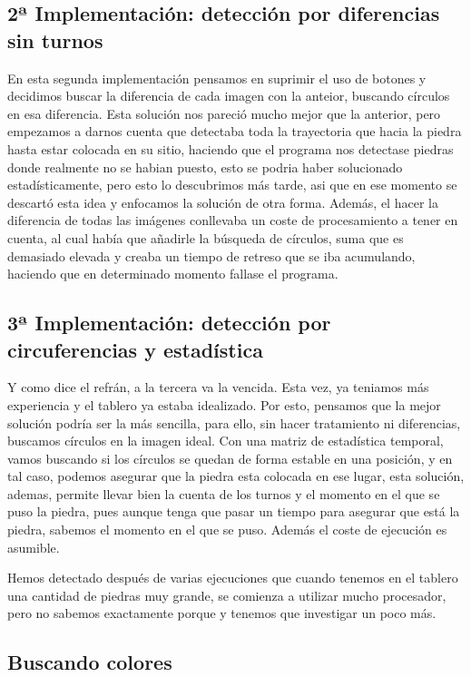 \documentclass[12pt,a4papert,woside,openright,titlepage,final]{book}
\begin{document}
\subsection{2ª Implementación: detección por diferencias sin turnos}

En esta segunda implementación pensamos en suprimir el uso de botones y
decidimos buscar la diferencia de cada imagen con la anteior, buscando círculos
en esa diferencia. Esta solución nos pareció mucho mejor que la anterior, pero
empezamos a darnos cuenta que detectaba toda la trayectoria que hacia la piedra
hasta estar colocada en su sitio, haciendo que el programa nos detectase piedras
donde realmente no se habian puesto, esto se podria haber solucionado
estadísticamente, pero esto lo descubrimos más tarde, asi que en ese momento se
descartó esta idea y enfocamos la solución de otra forma. Además, el hacer la
diferencia de todas las imágenes conllevaba un coste de procesamiento a tener en
cuenta, al cual había que añadirle la búsqueda de círculos, suma que es
demasiado elevada y creaba un tiempo de retreso que se iba acumulando, haciendo
que en determinado momento fallase el programa.

\subsection{3ª Implementación: detección por circuferencias y estadística}

Y como dice el refrán, a la tercera va la vencida. Esta vez, ya teniamos más
experiencia y el tablero ya estaba idealizado. Por esto, pensamos que la mejor
solución podría ser la más sencilla, para ello, sin hacer tratamiento ni
diferencias, buscamos círculos en la imagen ideal. Con una matriz de estadística
temporal, vamos buscando si los círculos se quedan de forma estable en una
posición, y en tal caso, podemos asegurar que la piedra esta colocada en ese
lugar, esta solución, ademas, permite llevar bien la cuenta de los turnos y el
momento en el que se puso la piedra, pues aunque tenga que pasar un tiempo para
asegurar que está la piedra, sabemos el momento en el que se puso. Además el
coste de ejecución es asumible.

Hemos detectado después de varias ejecuciones que cuando tenemos en el tablero
una cantidad de piedras muy grande, se comienza a utilizar mucho procesador,
pero no sabemos exactamente porque y tenemos que investigar un poco más. 

\subsection{Buscando colores}
\end{document}
